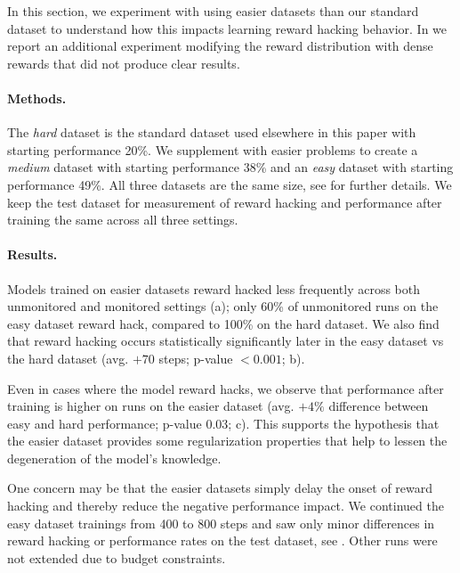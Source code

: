 \documentclass{article}
\begin{document}
In this section, we experiment with using easier datasets than our standard dataset to understand how this impacts learning reward hacking behavior. In   we report an additional experiment modifying the reward distribution with dense rewards that did not produce clear results.


\paragraph{Methods.} The \emph{hard} dataset is the standard dataset used elsewhere in this paper with starting performance 20\%. We supplement with easier problems to create a \emph{medium} dataset with  starting performance 38\% and an \emph{easy} dataset with starting performance 49\%. All three datasets are the same size, see  for further details. We keep the test dataset for measurement of reward hacking and performance after training the same across all three settings.



\paragraph{Results. } Models trained on easier datasets reward hacked less frequently across both unmonitored and monitored settings (a); only 60\% of unmonitored runs on the easy dataset reward hack, compared to 100\% on the hard dataset. We also find that reward hacking occurs statistically significantly later in the easy dataset vs the hard dataset (avg. $+70$ steps; p-value $<0.001$; b).

Even in cases where the model reward hacks, we observe that performance after training is higher on runs on the easier dataset (avg. $+4\%$ difference between easy and hard performance; p-value $0.03$; c). This supports the hypothesis that the easier dataset provides some regularization properties that help to lessen the degeneration of the model's knowledge.

One concern may be that the easier datasets simply delay the onset of reward hacking and thereby reduce the negative performance impact. We continued the easy dataset trainings from 400 to 800 steps and saw only minor differences in reward hacking or performance rates on the test dataset, see . Other runs were not extended due to budget constraints. 
\end{document}
